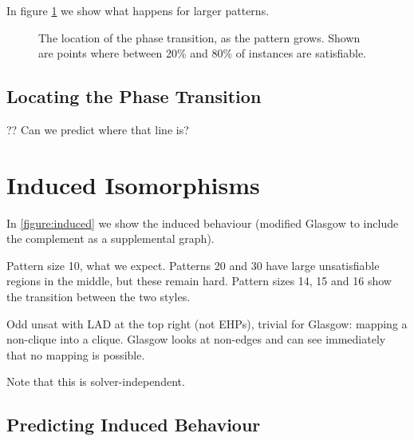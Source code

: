 \documentclass[letterpaper]{article}
\begin{document}
In figure \cref{figure:phase-transition-bands} we show what happens for larger patterns.

\begin{figure}[tb]
    
    \caption{The location of the phase transition, as the pattern grows. Shown are points where
    between 20\% and 80\% of instances are satisfiable.}
    \label{figure:phase-transition-bands}
\end{figure}

\lipsum[4]

\subsection{Locating the Phase Transition}

?? Can we predict where that line is?

\lipsum[5]

\lipsum[6]

\section{Induced Isomorphisms}

In \cref{figure:induced} we show the induced behaviour (modified Glasgow to include the complement
as a supplemental graph).

Pattern size 10, what we expect. Patterns 20 and 30 have large unsatisfiable regions in the middle,
but these remain hard. Pattern sizes 14, 15 and 16 show the transition between the two styles.

Odd unsat with LAD at the top right (not EHPs), trivial for Glasgow: mapping a non-clique into a
clique. Glasgow looks at non-edges and can see immediately that no mapping is possible.

Note that this is solver-independent.

\lipsum[7]

\lipsum[8]

\begin{figure*}[t]
    
    \caption{Behaviour of algorithms on the induced variant, shown in the style
    of \cref{figure:non-induced}. The second row shows a bound on the satisfiable region, by
    considering where a \emph{non-}induced isomorphism may also be a non-induced isomorphism between
    complement graphs.}\label{figure:induced}
\end{figure*}

\subsection{Predicting Induced Behaviour}
\end{document}
